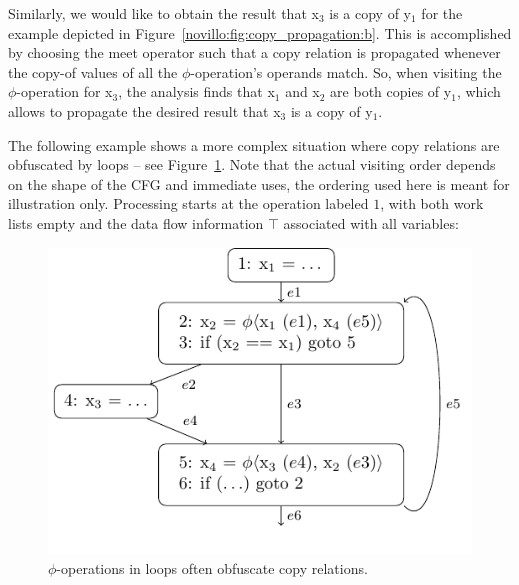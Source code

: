 Similarly, we would like to obtain the result that x$_3$ is a copy of y$_1$ for
the example depicted in Figure~\ref{novillo:fig:copy_propagation:b}. This is
accomplished by choosing the meet operator such that a copy relation is
propagated whenever the copy-of values of all the $\phi$-operation's operands
match. So, when visiting the $\phi$-operation for x$_3$, the analysis finds
that x$_1$ and x$_2$ are both copies of y$_1$, which allows to propagate the
desired result that x$_3$ is a copy of y$_1$.

The following example shows a more complex situation where copy relations are
obfuscated by loops -- see Figure~\ref{novillo:fig:copy_propagation_loop}.  Note
that the actual visiting order depends on the shape of the CFG and immediate
uses, the ordering used here is meant for illustration only. Processing starts
at the operation labeled $1$, with both work lists empty and the data flow
information $\top$ associated with all variables:

\begin{figure}[t!]
  \begin{center}
    \includegraphics{copy_propagation_loop}
  \end{center}
  \vspace{-1em}
  \caption{$\phi$-operations in loops often obfuscate copy relations.}
  \label{novillo:fig:copy_propagation_loop}
\end{figure}

